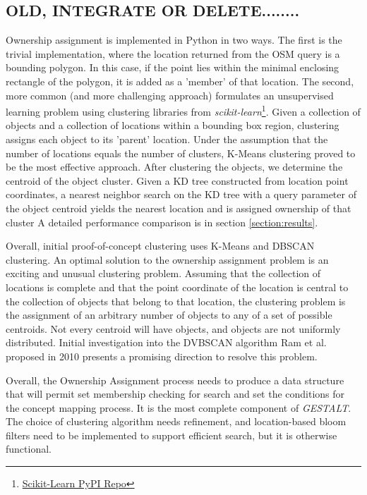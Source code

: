 \subsection{OLD, INTEGRATE OR DELETE........}
Ownership assignment is implemented in Python in two ways. The first is the trivial implementation, where the location returned from the OSM query is a bounding polygon. 
In this case, if the point lies within the minimal enclosing rectangle of the polygon, it is added as a 'member' of that location. 
The second, more common (and more challenging approach) formulates an unsupervised learning problem using clustering libraries from \textit{scikit-learn}\footnote{\href{https://pypi.org/project/scikit-learn/}{Scikit-Learn PyPI Repo}}. 
Given a collection of objects and a collection of locations within a bounding box region, clustering assigns each object to its 'parent' location. 
Under the assumption that the number of locations equals the number of clusters, K-Means clustering proved to be the most effective approach. 
After clustering the objects, we determine the centroid of the object cluster. Given a KD tree constructed from location point coordinates, a nearest neighbor search on the KD tree with a query parameter of the object centroid yields the nearest location and is assigned ownership of that cluster
A detailed performance comparison is in section \ref{section:results}. 

Overall, initial proof-of-concept clustering uses K-Means and DBSCAN clustering. An optimal solution to the ownership assignment problem is an exciting and unusual clustering problem. 
Assuming that the collection of locations is complete and that the point coordinate of the location is central to the collection of objects that belong to that location, the clustering problem is the assignment of an arbitrary number of objects to any of a set of possible centroids. Not every centroid will have objects, and objects are not uniformly distributed. Initial investigation into the DVBSCAN algorithm Ram et al. proposed in 2010 presents a promising direction to resolve this problem.\cite{Ram2010} 

Overall, the Ownership Assignment process needs to produce a data structure that will permit set membership checking for search and set the conditions for the concept mapping process. It is the most complete component of \textit{GESTALT}. The choice of clustering algorithm needs refinement, and location-based bloom filters need to be implemented to support efficient search, but it is otherwise functional. 